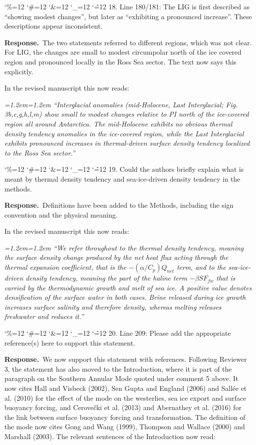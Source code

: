 \documentclass[11pt,a4paper]{article}
\newcommand{\comment}[1]{\par\medskip\noindent\color{black}\begingroup\catcode`\%=12 \catcode`\#=12 \catcode`\&=12 \catcode`\_=12 \catcode`\~=12 \commentbody}
\newcommand{\commentbody}[1]{#1\endgroup\par\smallskip}
\newcommand{\response}{\par\noindent\color{chgcol}\textbf{Response.}\ }
\newenvironment{change}{\par\smallskip\color{chgcol}\small\itshape\leftskip=1.2em\rightskip=1.2em\noindent\ignorespaces}{\par\smallskip}
\begin{document}
\comment{R1}{18. Line 180/181: The LIG is first described as ``showing modest changes'', but later as ``exhibiting a pronounced increase''. These descriptions appear inconsistent.}

\response The two statements referred to different regions, which was not clear. For LIG, the changes are small to modest circumpolar north of the ice covered region and pronounced locally in the Ross Sea sector. The text now says this explicitly.

In the revised manuscript this now reads:

\begin{change}
``Interglacial anomalies (mid-Holocene, Last Interglacial; Fig. 3b,c,g,h,l,m) show small to modest changes relative to PI north of the ice-covered region all around Antarctica. The mid-Holocene exhibits no obvious thermal density tendency anomalies in the ice-covered region, while the Last Interglacial exhibits pronounced increases in thermal-driven surface density tendency localized to the Ross Sea sector.''
\end{change}

\comment{R1}{19. Could the authors briefly explain what is meant by thermal density tendency and sea-ice-driven density tendency in the methods.}

\response Definitions have been added to the Methods, including the sign convention and the physical meaning.

In the revised manuscript this now reads:

\begin{change}
``We refer throughout to the thermal density tendency, meaning the surface density change produced by the net heat flux acting through the thermal expansion coefficient, that is the $-\left(\alpha/C_p\right)Q_{net}$ term, and to the sea-ice-driven density tendency, meaning the part of the haline term $-\beta S F_{fw}$ that is carried by the thermodynamic growth and melt of sea ice. A positive value denotes densification of the surface water in both cases. Brine released during ice growth increases surface salinity and therefore density, whereas melting releases freshwater and reduces it.''
\end{change}

\comment{R1}{20. Line 209: Please add the appropriate reference(s) here to support this statement.}
\response We now support this statement with references. Following Reviewer 3, the statement has also moved to the Introduction, where it is part of the paragraph on the Southern Annular Mode quoted under comment 5 above. It now cites Hall and Visbeck (2002), Sen Gupta and England (2006) and Sallée et al. (2010) for the effect of the mode on the westerlies, sea ice export and surface buoyancy forcing, and Cerovečki et al. (2013) and Abernathey et al. (2016) for the link between surface buoyancy forcing and transformation. The definition of the mode now cites Gong and Wang (1999), Thompson and Wallace (2000) and Marshall (2003). The relevant sentences of the Introduction now read:
\end{document}
